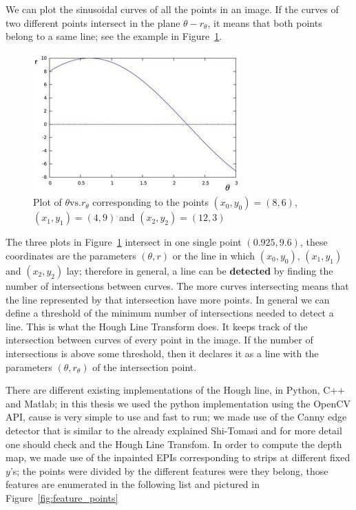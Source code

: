 \bigskip

We can plot the sinusoidal curves of all the points in an image. If the curves of two different points intersect in the plane $\theta-r_{\theta}$, it means that both points belong to a same line; see the example in Figure~\ref{fig:intersection-hough}.

\begin{figure}[h!]
\centering
\includegraphics[width = 0.8 \textwidth]{./Diagrams/family-lines-hough.jpg}
\caption{Plot of $\theta\textrm{vs.}r_{\theta}$ corresponding to the points $(x_0,y_0)=(8,6)$, $(x_1,y_1)=(4,9)$ and $(x_2,y_2)=(12,3)$}
\label{fig:intersection-hough}
\end{figure}

\bigskip

The three plots in Figure~\ref{fig:intersection-hough} intersect in one single point $(0.925,9.6)$, these coordinates are the parameters $(\theta,r)$ or the line in which $(x_0,y_0)$, $(x_1,y_1)$ and $(x_2,y_2)$ lay; therefore in general, a line can be \textbf{detected} by finding the number of intersections between curves. The more curves intersecting means that the line represented by that intersection have more points. In general we can define a threshold of the minimum number of intersections needed to detect a line. This is what the Hough Line Transform does. It keeps track of the intersection between curves of every point in the image. If the number of intersections is above some threshold, then it declares it as a line with the parameters $(\theta,r_{\theta})$ of the intersection point.

\bigskip 

There are different existing implementations of the Hough line, in Python, C++ and Matlab; in this thesis we used the python implementation using the OpenCV API, cause is very simple to use and fast to run; we made use of the Canny edge detector that is similar to the already explained Shi-Tomasi and for more detail one should check \cite{LearnOpenCV} and the Hough Line Transfom. In order to compute the depth map, we made use of the inpainted EPIs corresponding to strips at different fixed $y$'s; the points were divided by the different features were they belong, those features are enumerated in the following list and pictured in Figure~\ref{fig:feature_points}

